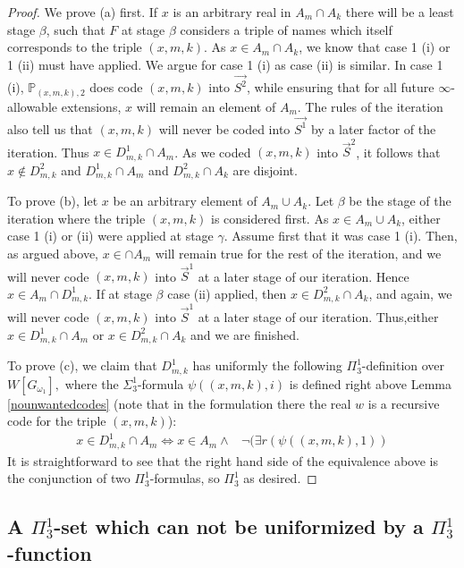 \documentclass[a4paper,11pt]{article}
\newcommand{\forceP}{\mathbb{P}}
\begin{document}
\begin{proof}
We prove (a) first. If $x$ is an arbitrary real in $A_m \cap A_k$ there will be a least stage $\beta$, such that $F$ at stage $\beta$ considers a triple of names which itself corresponds to the triple  $(x,m,k)$. As $x \in A_m \cap A_k$, we know that case 1 (i)  or 1 (ii) must have applied. We argue for case 1 (i) as case (ii) is similar. In case 1 (i), $\forceP_{(x,m,k),2}$ does code $(x,m,k)$ into $\vec{S^2}$, while ensuring that for all future $\infty$-allowable extensions, $x $ will remain an element of $A_m$.  The rules of the iteration also tell us that $(x,m,k)$ will never be coded into $\vec{S^1}$ by a later factor of the iteration. Thus $x \in D^1_{m,k} \cap A_m$. As we coded $(x,m,k)$ into $\vec{S}^2$, it follows that $x \notin D^2_{m,k}$ and $D^1_{m,k} \cap A_m$ and $D^2_{m,k} \cap A_k$ are disjoint.

To prove (b), let $x$ be an arbitrary element of $A_m \cup A_k$. Let $\beta$ be the stage of the iteration where the triple $(x,m,k)$ is considered first. As $x \in A_m \cup A_k$, either case 1 (i) or (ii) were applied at stage $\gamma$.
Assume first that it was case 1 (i). Then, as argued above, $x \in \cap A_m$ will remain true for the rest of the iteration,  and we will never code $(x,m,k)$ into $\vec{S}^1$ at a later stage of our iteration. Hence $x \in A_m \cap D^1_{m,k}$. If at stage $\beta$ case (ii) applied, then $x \in D^2_{m,k} \cap A_k$, and again, we will never code $(x,m,k)$ into $\vec{S}^1$ at a later stage of our iteration. Thus,either $x \in D^1_{m,k} \cap A_m$ or $x \in D^2_{m,k} \cap A_k$ and we are finished.

To prove (c), we claim that $D^1_{m,k}$ has uniformly the following $\Pi^1_3$-definition over $W[G_{\omega_1}],$ where the $\Sigma^1_3$-formula $\psi((x,m,k),i)$ is defined right above Lemma \ref{nounwantedcodes} (note that in the formulation there the real $w$ is a recursive code for the triple $(x,m,k)$):
\begin{align*}
x \in D^1_{m,k} \cap A_m \Leftrightarrow x \in A_m  \land& \lnot(\exists r (\psi( (x,m,k),1))
\end{align*} 
It is straightforward to see that the right hand side of the equivalence above is the conjunction of two $\Pi^1_3$-formulas, so $\Pi^1_3$ as desired. 
\end{proof}


\subsection{A $\Pi^1_3$-set which can not be uniformized by a $\Pi^1_3$-function}
\end{document}
